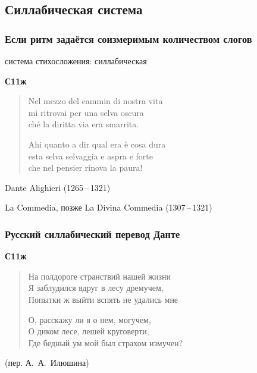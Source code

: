 \documentclass{beamer}
\begin{document}

\subsection{Силлабическая система}\label{sec:syl}

\begin{frame}
\frametitle{Если ритм задаётся соизмеримым 
количеством слогов}

система стихосложения: силлабическая

\textbf{С11ж}

\begin{verse}
Nel mezzo del cammin di nostra vita\\
mi ritrovai per una selva oscura\\
ché la diritta via era smarrita.

Ahi quanto a dir qual era è cosa dura\\
esta selva selvaggia e aspra e forte\\
che nel pensier rinova la paura!
\end{verse}
Dante Alighieri (1265\,--\,1321)

La Commedia, позже La Divina Commedia (1307\,--\,1321)

\end{frame}



\begin{frame}
\frametitle{Русский силлабический перевод Данте}
\textbf{С11ж}

\begin{verse}
На полдороге странствий нашей жизни\\
Я заблудился вдруг в лесу дремучем,\\
Попытки ж выйти вспять не удались мне

О, расскажу ли я о нем, могучем, \\
О диком лесе, лешей круговерти, \\
Где бедный ум мой был страхом измучен?
\end{verse}

\begin{flushright}
(пер. А.~А.~Илюшина)
\end{flushright}
\end{frame}



\end{document}

